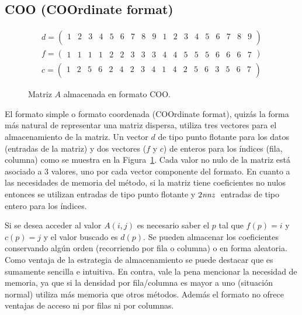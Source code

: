 \subsection{COO (COOrdinate format)}\label{coo-format}
\begin{figure}[h]
\begin{center}
\begin{eqnarray*}
d = \left(
\begin{array}{cccccccccccccccccc}
1 & 2 & 3 & 4 & 5 & 6 & 7 & 8 & 9 & 1 & 2 & 3 & 4 & 5 & 6 & 7 & 8 & 9\\
\end{array}
\right)\nonumber\\ 
f = \left(
\begin{array}{cccccccccccccccccc}
1 & 1 & 1 & 1 & 2 & 2 & 3 & 3 & 3 & 4 & 4 & 5 & 5 & 5 & 6 & 6 & 6 & 7
\end{array}
\right)\nonumber\\
c = \left(
\begin{array}{cccccccccccccccccc}
1 & 2 & 5 & 6 & 2 & 4 & 2 & 3 & 4 & 1 & 4 & 2 & 5 & 6 & 3 & 5 & 6 & 7\\
\end{array}
\right)\nonumber
\end{eqnarray*}
\end{center}
\caption{Matriz $A$ almacenada en formato COO.}
\label{simple-matrix}
\end{figure}

El formato simple o formato coordenada (COOrdinate format), quizás la forma más natural de representar una matriz dispersa, utiliza tres vectores para el almacenamiento de la matriz. Un vector $d$ de tipo punto flotante para los datos (entradas de la matriz) y dos vectores ($f$ y $c$) de enteros para los índices (fila, columna) como se muestra en la Figura~\ref{simple-matrix}. Cada valor no nulo de la matriz está asociado a 3 valores, uno por cada vector componente del formato.
En cuanto a las necesidades de memoria del método, si la matriz tiene \nnz 
coeficientes no nulos entonces se utilizan \nnz entradas de tipo punto flotante y $2\textit{nnz }$ entradas de tipo entero para los índices.


Si se desea acceder al valor $A(i, j)$ es necesario saber el $p$ tal que $f(p) = i$ y $c(p) = j$ y el valor buscado es $d(p)$. Se pueden almacenar los coeficientes conservando algún orden (recorriendo por fila o columna) o en forma aleatoria.
Como ventaja de la estrategia de almacenamiento se puede destacar que es sumamente sencilla e intuitiva. %
En contra, vale la pena mencionar la necesidad de memoria, ya que si la densidad por fila/columna es mayor a uno (situación normal) utiliza más memoria que otros métodos. Además el formato no ofrece ventajas de acceso ni por filas ni por columnas.

